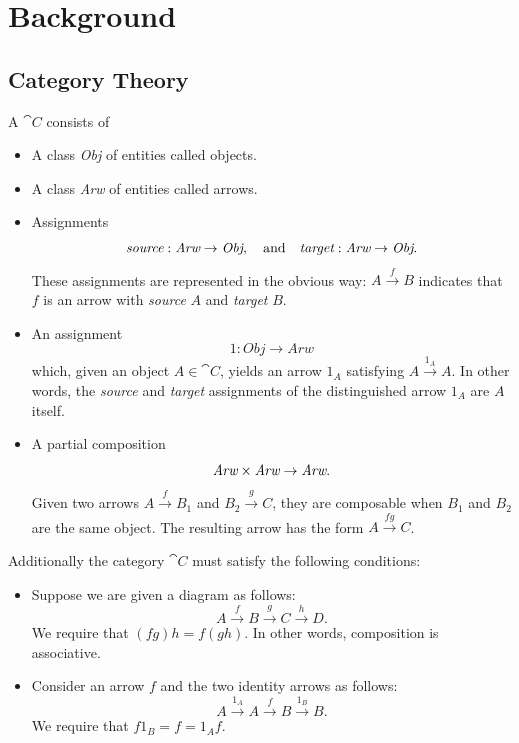 \chapter{Background}
\label{chap:background}


\section{Category Theory}
\label{section:categoryThry}

\begin{Def}
    A  \(\cat{C}\) consists of 
    \begin{itemize}
        \item A class \emph{Obj} of entities called objects.
        \item A class \emph{Arw} of entities called arrows.
        \item Assignments
        \[\textit{source}:\textit{Arw}\to\textit{Obj},\quad\text{and}\quad\textit{target}:\textit{Arw}\to\textit{Obj}.\]
        These assignments are represented in the obvious way: \(A\xrightarrow{f}B\) indicates that \(f\) is an arrow with \emph{source} \(A\) and \emph{target} \(B\). 
        \item An assignment 
        \[
        1:\textit{Obj}\to\textit{Arw}
        \]
        which, given an object \(A\in\cat{C}\), yields an arrow \(1_A\) satisfying \(A\xrightarrow{1_A}A\). In other words, the \emph{source} and \emph{target} assignments of the distinguished arrow \(1_A\) are \(A\) itself.
        \item A partial composition
        \[
        \textit{Arw}\times\textit{Arw}\to\textit{Arw}.
        \]
        Given two arrows \(A\xrightarrow{f}B_1\) and \(B_2\xrightarrow{g}C\), they are composable when \(B_1\) and \(B_2\) are the same object. The resulting arrow has the form \(A\xrightarrow{fg}C\).
    \end{itemize}
    Additionally the category \(\cat{C}\) must satisfy the following conditions:
    \begin{itemize}
        \item Suppose we are given a diagram as follows:
        \[
        A\xrightarrow{f}B\xrightarrow{g}C\xrightarrow{h}D.
        \]
        We require that \((fg)h=f(gh)\). In other words, composition is associative.
        \item Consider an arrow \(f\) and the two identity arrows as follows:
        \[
        A\xrightarrow{1_A}A\xrightarrow{f}B\xrightarrow{1_B}B.
        \]
        We require that \(f1_B=f=1_Af\).
    \end{itemize}
\end{Def}

